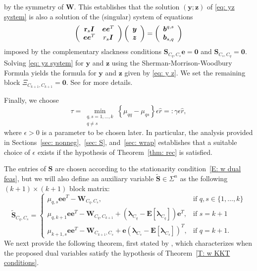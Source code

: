 \documentclass[twoside,11pt]{article}
\renewcommand{\S}{\mathbf{S}}
\newcommand{\E}{\mathbf{E}}
\newcommand{\St}{\bs{\tilde S}}
\renewcommand{\b}{{\bs{b}}}
\newcommand{\e}{\bs {e}}
\renewcommand{\r}{\mathbf{r}}
\newcommand{\bs}{\boldsymbol}
\newcommand{\y}{\bs {y}}
\newcommand{\W}{\bs {W}}
\newcommand{\z}{\bs{z}}
\newcommand{\0}{\bs{0}}
\newcommand{\vect}[1] {\ensuremath{\left(\begin{array}{c} #1 \end{array} \right)}} %
\newcommand{\mat}[1] {\ensuremath{ \left(\begin{array} #1 \end{array} \right)}} %
\newcommand{\branchdef}[1] {\ensuremath{ \left\{\begin{array}{rl} #1 \end{array} \right. }} %
\newcommand{\bra}[1]{\ensuremath{\left\{ #1 \right\}}} %
\newcommand{\eq}[1]{\(#1\)}
\begin{document}
{\[\]
by the symmetry of \eq{\W}. This establishes that the solution
\((\y; \z)\) of \eqref{eq: yz system}
is also a solution of the (singular) system of equations
\[
	\mat{{cc} \r_s \I & \e\e^T  \\ \e\e^T & r_s \I }
	\vect{ \y \\ \z } = \vect{\b^{q,s} \\ \b_{s,q} }
\]
imposed by the complementary slackness conditions
${\S_{C_q, C_s} \e = \0}$ and ${\S_{C_s, C_q} = \0 }$.
Solving \eqref{eq: yz system} for ${\y}$ and $\z$
using the Sherman-Morrison-Woodbury
Formula
yields the formula for $\y$ and $\z$ given by
\eqref{eq: y z}.
We set the remaining block $\Xi_{C_{k+1}, C_{k+1} } = \0$.
See \citet[Section~4.2]{ames2014guaranteed} for more details.

Finally, we choose
\begin{equation} \label{eq: mu}
\tau = \min_{\substack{q,s=1,\dots, k \\ q \neq s }} \bra{\mu_{qq} - \mu_{qs}} \epsilon  \hat r =: \gamma\epsilon  \hat r,
\end{equation}
where \(\epsilon > 0\) is a parameter to be chosen later.
In particular, the analysis provided in Sections~\ref{sec: nonneg},~\ref{sec: S}, and~\ref{sec: wrap} establishes that
a suitable choice of $\epsilon$ exists if the hypothesis of
Theorem~\ref{thm: rec} is satisfied.

The entries of \(\S\) are chosen according to the stationarity condition~\eqref{E: w dual feas}, but we will also define
an auxiliary variable \(\St \in \Sigma^n\) as the following \((k+1)\times (k+1)\) block matrix:
\begin{equation} \label{e: tilde S def}
\St_{C_q, C_s} = \branchdef{
	\mu_{q,s}\e\e^T - \W_{C_q, C_s},  & \mbox{if } q, s \in \{1,\dots, k\} \\
	\mu_{q,k+1} \e\e^T - \W_{C_q, C_{k+1}} + (\bs\lambda_{C_q} - \E[\bs\lambda_{C_q}] )\e^T ,  & \mbox{if } s = {k+1}  \\
	\mu_{k+1,s} \e\e^T - \W_{C_{k+1}, C_s} + \e (\bs \lambda_{C_s} - \E[\bs\lambda_{C_s}] )^T,   & \mbox{if } q = {k+1} .
}
\end{equation}
We next provide the following theorem, first stated by \citet[Theorem~4.2]{ames2014guaranteed},
which characterizes when the proposed dual variables satisfy the hypothesis
of Theorem~\ref{T:  w KKT conditions}.

}
\end{document}
